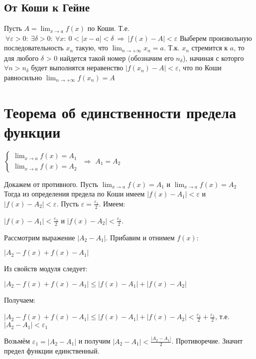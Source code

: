\subsection{От Коши к Гейне}
Пусть $\displaystyle A = \lim_{x \to a} f(x)$ по Коши. Т.е.\newline
$\displaystyle\ \forall \varepsilon > 0 : \ \exists \delta > 0: \ \forall x : \ 0 < |x - a| < \delta \ \Rightarrow \ |f(x) - A| < \varepsilon $\newline
Выберем произвольную последовательность  $x_n$  такую, что  $\displaystyle \lim_{n \to +\infty} x_n = a$. Т.к. $x_n$ стремится к $a$, то для любого $\delta$ > 0 найдется такой номер (обозначим его $n_\delta$), начиная с которго $\forall n>n_\delta$ будет выполнятся неравенство $|f(x_n) - A|<\varepsilon$, что по Коши равносильно $\displaystyle \lim_{n \to +\infty} f(x_n) = A$

\section{Теорема об единственности предела функции}
\begin{theorem}
$\begin{cases}\displaystyle \lim_{x \to a} f(x) = A_1 \\ \displaystyle \lim_{x \to a} f(x) = A_2\end{cases}$
$\Longrightarrow$ \qquad $\displaystyle A_1 = A_2$
\end{theorem}
Докажем от противного. Пусть $\displaystyle \lim_{x \to a} f(x) = A_1$ и $\displaystyle \lim_{x \to a} f(x) = A_2$\newline
Тогда из определения предела по Коши имеем $|f(x) - A_1| < \varepsilon$ и $|f(x) - A_2| < \varepsilon$.\newline 
Пусть $\varepsilon = \frac{\varepsilon_1}{2}$. Имеем:
\begin{center}$|f(x) - A_1| < \frac{\varepsilon_1}{2}$ и $|f(x) - A_2| < \frac{\varepsilon_1}{2}$.\end{center}
Рассмотрим выражение $|A_2 - A_1|$. Прибавим и отнимем $f(x)$:
\begin{center}$|A_2 - f(x) + f(x) - A_1|$\end{center}
Из свойств модуля следует:
\begin{center}$|A_2 - f(x) + f(x) - A_1| \leq |f(x) - A_1| + |f(x) - A_2|$\end{center}
Получаем:
\begin{center}$|A_2 - f(x) + f(x) - A_1| \leq |f(x) - A_1| + |f(x) - A_2| < \frac{\varepsilon_1}{2} + \frac{\varepsilon_1}{2}$, т.е. $|A_2 - A_1| < \varepsilon_1$\end{center}
Возьмём $\varepsilon_1 = |A_2 - A_1|$ и получим $|A_2 - A_1| < \frac{|A_2 - A_1|}{2}$. Противоречие. Значит предел функции единственный.

